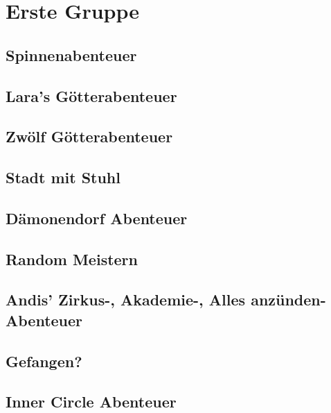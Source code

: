 \chapter{Erste Gruppe}
\section{Spinnenabenteuer}
\section{Lara's G\"otterabenteuer}
\section{Zw\"olf G\"otterabenteuer}
\section{Stadt mit Stuhl}
\section{D\"amonendorf Abenteuer}
\section{Random Meistern}
\section{Andis' Zirkus-, Akademie-, Alles anz\"unden-Abenteuer}
\section{Gefangen?}
\section{Inner Circle Abenteuer}